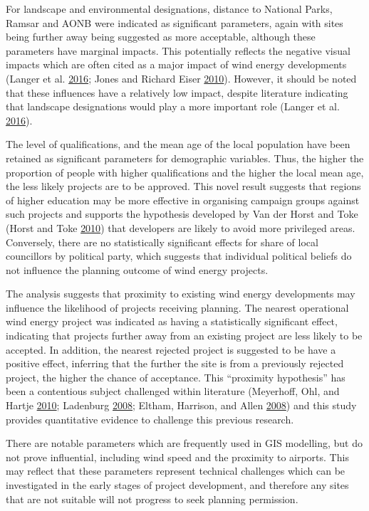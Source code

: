 \documentclass[a4paper,]{article}
\theoremstyle{definition}
\theoremstyle{definition}
\theoremstyle{definition}
\theoremstyle{remark}
\begin{document}
For landscape and environmental designations, distance to National
Parks, Ramsar and AONB were indicated as significant parameters, again
with sites being further away being suggested as more acceptable,
although these parameters have marginal impacts. This potentially
reflects the negative visual impacts which are often cited as a major
impact of wind energy developments (Langer et al.
\protect\hyperlink{ref-Langer2016}{2016}; Jones and Richard Eiser
\protect\hyperlink{ref-Jones2010}{2010}). However, it should be noted
that these influences have a relatively low impact, despite literature
indicating that landscape designations would play a more important role
(Langer et al. \protect\hyperlink{ref-Langer2016}{2016}).

The level of qualifications, and the mean age of the local population
have been retained as significant parameters for demographic variables.
Thus, the higher the proportion of people with higher qualifications and
the higher the local mean age, the less likely projects are to be
approved. This novel result suggests that regions of higher education
may be more effective in organising campaign groups against such
projects and supports the hypothesis developed by Van der Horst and Toke
(Horst and Toke \protect\hyperlink{ref-VanderHorst2010}{2010}) that
developers are likely to avoid more privileged areas. Conversely, there
are no statistically significant effects for share of local councillors
by political party, which suggests that individual political beliefs do
not influence the planning outcome of wind energy projects.

The analysis suggests that proximity to existing wind energy
developments may influence the likelihood of projects receiving
planning. The nearest operational wind energy project was indicated as
having a statistically significant effect, indicating that projects
further away from an existing project are less likely to be accepted. In
addition, the nearest rejected project is suggested to be have a
positive effect, inferring that the further the site is from a
previously rejected project, the higher the chance of acceptance. This
``proximity hypothesis'' has been a contentious subject challenged
within literature (Meyerhoff, Ohl, and Hartje
\protect\hyperlink{ref-Meyerhoff2010}{2010}; Ladenburg
\protect\hyperlink{ref-Ladenburg2008}{2008}; Eltham, Harrison, and Allen
\protect\hyperlink{ref-Eltham2008}{2008}) and this study provides
quantitative evidence to challenge this previous research.

There are notable parameters which are frequently used in GIS modelling,
but do not prove influential, including wind speed and the proximity to
airports. This may reflect that these parameters represent technical
challenges which can be investigated in the early stages of project
development, and therefore any sites that are not suitable will not
progress to seek planning permission.
\end{document}
